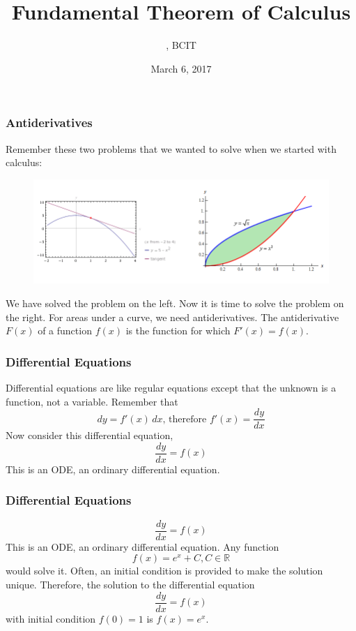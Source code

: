 \documentclass[xcolor=dvipsnames]{beamer}
\title{Fundamental Theorem of Calculus}
\subtitle{{\CourseNumber}, BCIT}
\author{\CourseName}
\date{March 6, 2017}
\begin{document}
\begin{frame}
  \titlepage
\end{frame}

\begin{frame}
  \frametitle{Antiderivatives}
Remember these two problems that we wanted to solve when we started
with calculus:
  \begin{figure}[h]
    \includegraphics[scale=.35]{./diagrams/regiontangent.png}
  \end{figure}
We have solved the problem on the left. Now it is time to solve the
problem on the right. For areas under a curve, we need
antiderivatives. The antiderivative $F(x)$ of a function $f(x)$ is the
function for which $F'(x)=f(x)$. 
\end{frame}

\begin{frame}
  \frametitle{Differential Equations}
Differential equations are like regular equations except that the
unknown is a function, not a variable. Remember that
\begin{equation}
  \label{eq:aiceiphe}
  dy=f'(x)\,dx\mbox{, therefore }f'(x)=\frac{dy}{dx}
\end{equation}
Now consider this differential equation,
\begin{equation}
  \label{eq:pheiwaot}
  \frac{dy}{dx}=f(x)
\end{equation}
This is an ODE, an \alert{ordinary differential equation}. 
\end{frame}

\begin{frame}
  \frametitle{Differential Equations}
\begin{equation}
  \label{eq:ahngohto}
  \frac{dy}{dx}=f(x)
\end{equation}
This is an ODE, an \alert{ordinary differential equation}. Any
function
\begin{equation}
  \label{eq:ogheigha}
  f(x)=e^{x}+C,C\in\mathbb{R}
\end{equation}
would solve it. Often, an \alert{initial condition} is provided to
make the solution unique. Therefore, the solution to the differential
equation
\begin{equation}
  \label{eq:joogeipo}
  \frac{dy}{dx}=f(x)
\end{equation}
with initial condition $f(0)=1$ is $f(x)=e^{x}$.
\end{frame}
\end{document}
